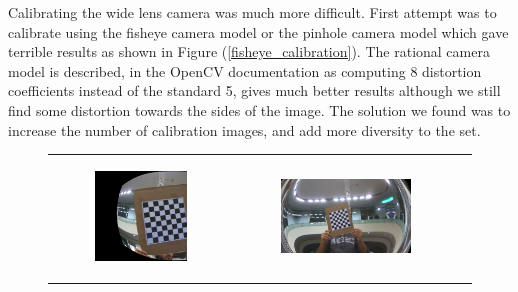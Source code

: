 \documentclass[12pt,letterpaper]{article}
\begin{document}
Calibrating the wide lens camera was much more difficult. First attempt was to calibrate using the fisheye camera model or the pinhole camera model which gave terrible results as shown in Figure (\ref{fisheye_calibration}). The rational camera model is described, in the OpenCV documentation as computing 8 distortion coefficients instead of the standard 5, gives much better results although we still find some distortion towards the sides of the image. The solution we found was to increase the number of calibration images, and add more diversity to the set.

	\begin{figure}[ht]
	\begin{tabular}[c]{ccc}
		\begin{subfigure}[c]{0.3\linewidth} 
			\includegraphics[width=\linewidth]{./images/fisheye_fisheye_calibration.png}
			\subcaption{Undistorted image using the fisheye camera model.}
		\end{subfigure}&
		\begin{subfigure}[c]{0.3\linewidth}
			\includegraphics[width=\linewidth]{./images/fisheye_pinhole_calibration.png}

\end{subfigure}
\end{tabular}
\end{figure}
\end{document}
